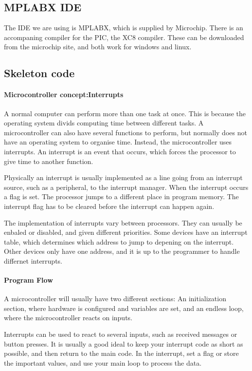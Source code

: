 \documentclass{article}
\begin{document}
\subsection{MPLABX IDE}
The IDE we are using is MPLABX, which is supplied by Microchip. There is an accompaning compiler for the PIC, the XC8 compiler. These can be downloaded from the microchip site, and both work for windows and linux.

\subsection{Skeleton code}
\paragraph{Microcontroller concept:Interrupts}
A normal computer can perform more than one task at once. This is because the operating system divids computing time between different tasks. A microcontroller can also have several functions to perform, but normally does not have an operating system to organise time. Instead, the microcontroller uses interrupts. An interrupt is an event that occurs, which forces the processor to give time to another function.  

Physically an interrupt is usually implemented as a line going from an interrupt source, such as a peripheral, to the interrupt manager. When the interrupt occurs a flag is set. The processor jumps to a different place in program memory. The interrupt flag has to be cleared before the interrupt can happen again.

The implementation of interrupts vary between processors. They can usually be enbaled or disabled, and given different priorities. Some devices have an interrupt table, which determines which address to jump to depening on the interrupt. Other devices only have one address, and it is up to the programmer to handle differnet interrupts.

\paragraph{Program Flow}
A microcontroller will usually have two different sections: An initialization section, where hardware is configured and variables are set, and an endless loop, where the microcontroller reacts on inputs.

Interrupts can be used to react to several inputs, such as received messages or button presses. It is usually a good ideal to keep your interrupt code as short as possible, and then return to the main code. In the interrupt, set a flag or store the important values, and use your main loop to process the data.
\end{document}
